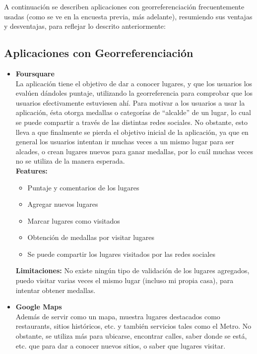 \documentclass[10pt,letterpaper]{article}
\begin{document}
A continuación se describen aplicaciones con georreferenciación frecuentemente usadas (como se ve en la encuesta previa, más adelante), resumiendo sus ventajas y desventajas, para reflejar lo descrito anteriormente:\\

\subsection{Aplicaciones con Georreferenciación}

\begin{itemize}
 
\item \textbf{Foursquare}\\

La aplicación tiene el objetivo de dar a conocer lugares, y que los usuarios los evalúen dándoles puntaje, utilizando la georreferencia para comprobar que los usuarios efectivamente estuviesen ahí. Para motivar a los usuarios a usar la aplicación, ésta otorga medallas o categorías de “alcalde” de un lugar, lo cual se puede compartir a través de las distintas redes sociales. No obstante, esto lleva a que finalmente se pierda el objetivo inicial de la aplicación, ya que en general los usuarios intentan ir muchas veces a un mismo lugar para ser alcades, o crean lugares nuevos para ganar medallas, por lo cuál muchas veces no se utiliza de la manera esperada.\\

\textbf{Features:}\\
\begin{itemize}
\item Puntaje y comentarios de los lugares
\item Agregar nuevos lugares
\item Marcar lugares como visitados
\item Obtención de medallas por visitar lugares
\item Se puede compartir los lugares visitados por las redes sociales
\end{itemize}

\textbf{Limitaciones:} No existe ningún tipo de validación de los lugares agregados, puedo visitar varias veces el mismo lugar (incluso mi propia casa), para intentar obtener medallas.

\item \textbf{Google Maps}\\

Además de servir como un mapa, muestra lugares destacados como restaurants, sitios históricos, etc. y también servicios tales como el Metro. No obstante, se utiliza más para ubicarse, encontrar calles, saber donde se está, etc. que para dar a conocer nuevos sitios, o saber que lugares visitar.\\


\end{itemize}
\end{document}
